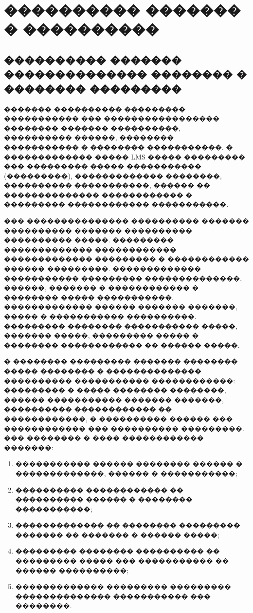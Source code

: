 \chapter{{\fontsize{14pt}{21pt}\selectfont\MakeUppercase{���������� ������� � ����������}}}
\label{cha:analysis}

\section{���������� ������� �������������� �������� � �������� ���������}

������� ���������� ��������� ����������� ��� ����������������� �������� ������� ����������, ���������� ������, �������� ����������� � �������� �����������. � ������������� ����� LMS ����� ��������� ��� ��������� ����� ����������� (���������), ������������� ��������, ���������� �����������, ������ �� �������������� ������������ � ��������� ������������ �����������\cite{moodle_lms,open_lms}.

��� ��������������� ���������� ������� ���������� ������� ���������� ���������� �����. ��������� ������������� ������������ ������������� ��������� � ������������ ������ ���������. ������������� ����������� ��������� ��������������, ������, ������� � ������������ � �������� ����� �����������. ������������� ������ ������� �������, ����� � ����������� ����������. ��������� �������� ����������� �����, ������� �����, ��������� ����� � �������� ������������ �� ������ �����.

� �������� ��������� ������� �������� ����� �������� � �������������� ���������� ����������� ������������: ��������� � ����� �������� ��������, ������ ����������� ������� �������, ���������� ������������ �� ������������, � ���������� ������ ��� ������������ ��� ���������� ���������. ��� �������� � ���� ������������ �������:
\begin{enumerate}
  \item ����������� ������ �������� ������ � �������������, ������ � �����������;
  \item ���������� ������������ �� ���������� ������ � �������� �����������;
  \item ������������� �� �������� ��������� ������� �� ������� � ������ �����;
  \item ��������� �������� ���������� �� ��������� ����� ��� ����������� �� ������ ����������;
  \item ������������� ��������� ��������� �������������� ����������� ��� ��������.
\end{enumerate}

